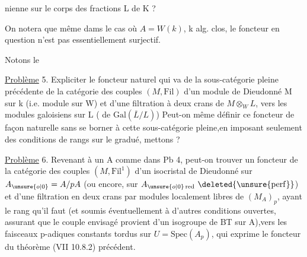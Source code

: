 nienne sur le corps des fractions  L de K ?

On notera que même dams le cas où $A=W(k)$, k alg. clos, le foncteur en question n'est pas  essentiellement surjectif.

Notons le

\uline{Problème} 5.  Expliciter le foncteur naturel qui va de la sous-catégorie pleine précédente de la catégorie des couples  $(M,\mathrm{Fil})$ d'un module de Dieudonné M sur  k (i.e.  module sur W) et d'une filtration à deux crans de $M\otimes_W L$, vers les modules galoisiens sur L (  de $\mathrm{Gal}(\overline{L}/L)$) Peut-on même définir ce foncteur  de façon naturelle sans se borner à cette sous-catégorie pleine,en imposant seulement des conditions de rangs sur le gradué, mettons ?

\uline{Problème} 6. Revenant à un A comme dans Pb 4, peut-on trouver un foncteur  de la catégorie des couples $(M,\mathrm{Fil}^{1})$ d'un isocristal de Dieudonné  sur $A_{\unsure{o|0}}=A/pA$ (ou encore, sur $A_{\unsure{o|0}\,\mathrm{red}}\ \deleted{\unsure{\mathrm{perf}}}$) et d'une filtration en deux crans par modules localement libres de $(M_A)_p$, ayant le rang qu'il faut\deleted{\unsure{,}} (et soumis éventuellement à d'autres conditions ouvertes, assurant que le couple envisagé provient d'un isogroupe de BT sur A),vers les faisceaux p-adiques constants tordus sur $U=\mathrm{Spec}(A_p)$, qui exprime le foncteur du théorème (VII 10.8.2) précédent.



